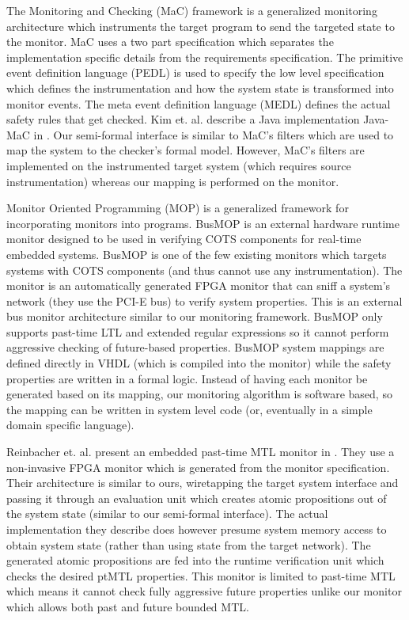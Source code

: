The Monitoring and Checking (MaC) framework \cite{Lee1999} is a generalized monitoring architecture which instruments the target program to send the targeted state to the monitor. MaC uses a two part specification which separates the implementation specific details from the requirements specification. 
The primitive event definition language (PEDL) is used to specify the low level specification which defines the instrumentation and how the system state is transformed into monitor events. The meta event definition language (MEDL) defines the actual safety rules that get checked. Kim et. al. describe a Java implementation Java-MaC in \cite{Kim2004}.
Our semi-formal interface is similar to MaC's filters which are used to map the system to the checker's formal model. However, MaC's filters are implemented on the instrumented target system (which requires source instrumentation) whereas our mapping is performed on the monitor.

Monitor Oriented Programming (MOP) is a generalized framework for incorporating monitors into programs.
BusMOP \cite{Pellizzoni2008} is an external hardware runtime monitor designed to be used in verifying COTS components for real-time embedded systems. BusMOP is one of the few existing monitors which targets systems with COTS components (and thus cannot use any instrumentation). The monitor is an automatically generated FPGA monitor that can sniff a system's network (they use the PCI-E bus) to verify system properties.
This is an external bus monitor architecture similar to our monitoring framework.
BusMOP only supports past-time LTL and extended regular expressions so it cannot perform aggressive checking of future-based properties. BusMOP system mappings are defined directly in VHDL (which is compiled into the monitor) while the safety properties are written in a formal logic. Instead of having each monitor be generated based on its mapping, our monitoring algorithm is software based, so the mapping can be written in system level code (or, eventually in a simple domain specific language).

Reinbacher et. al. present an embedded past-time MTL monitor in \cite{Reinbacher2013}. They use a non-invasive FPGA monitor which is generated from the monitor specification. Their architecture is similar to ours, wiretapping the target system interface and passing it through an evaluation unit which creates atomic propositions out of the system state (similar to our semi-formal interface). The actual implementation they describe does however presume system memory access to obtain system state (rather than using state from the target network). The generated atomic propositions are fed into the runtime verification unit which checks the desired ptMTL properties. This monitor is limited to past-time MTL which means it cannot check fully aggressive future properties unlike our monitor which allows both past and future bounded MTL.


